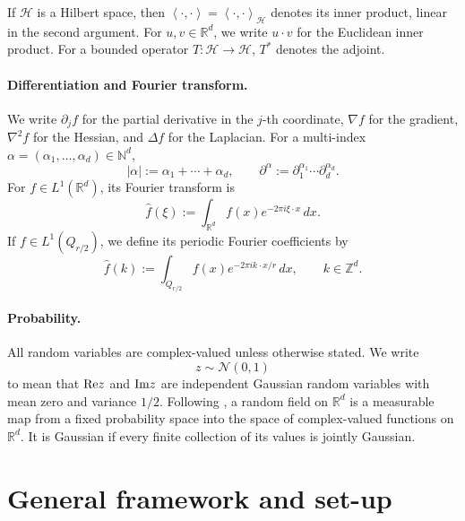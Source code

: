 \documentclass[11pt]{article}
\theoremstyle{definition}
\numberwithin{theorem}{section}
\numberwithin{lemma}{section}
\numberwithin{equation}{section}
\def\N{\mathbb{N}}
\def\R{\mathbb{R}}
\def\Z{\mathbb{Z}}
\renewcommand{\hat}{\widehat}
\renewcommand{\Re}{{\rm Re}}
\renewcommand{\Im}{{\rm Im}}
\newcommand{\inner}[1]{{\left\langle#1\right\rangle}}
\numberwithin{equation}{section}
\begin{document}
If ${\mathcal H}$ is a Hilbert space, then $\inner{\cdot,\cdot}=\inner{\cdot,\cdot}_{\mathcal H}$ denotes its inner product, linear in the second argument. For $u,v\in\R^d$, we write $u\cdot v$ for the Euclidean inner product. For a bounded operator $T\colon {\mathcal H}\to{\mathcal H}$, $T^*$ denotes the adjoint.

\paragraph{Differentiation and Fourier transform.}
We write $\partial_j f$ for the partial derivative in the $j$-th coordinate, $\nabla f$ for the gradient, $\nabla^2 f$ for the Hessian, and $\Delta f$ for the Laplacian. For a multi-index $\alpha=(\alpha_1,\dots,\alpha_d)\in\N^d$,
\[
|\alpha|:=\alpha_1+\cdots+\alpha_d,
\qquad
\partial^\alpha:=\partial_1^{\alpha_1}\cdots \partial_d^{\alpha_d}.
\]
For $f\in L^1(\R^d)$, its Fourier transform is
\[
\hat f(\xi):=\int_{\R^d} f(x)e^{-2\pi i \xi\cdot x}\,dx.
\]
If $f\in L^1(Q_{r/2})$, we define its periodic Fourier coefficients by
\[
\hat f(k):=\int_{Q_{r/2}} f(x)e^{-2\pi i k\cdot x/r}\,dx,
\qquad k\in\Z^d.
\]

\paragraph{Probability.}
All random variables are complex-valued unless otherwise stated. We write
\[
z\sim \mathcal N(0,1)
\]
to mean that $\Re z$ and $\Im z$ are independent Gaussian random variables with mean zero and variance $1/2$. Following \cite{adler2007random}, a random field on $\R^d$ is a measurable map from a fixed probability space into the space of complex-valued functions on $\R^d$. It is Gaussian if every finite collection of its values is jointly Gaussian.



	
	\section{General framework and set-up}
	\label{sec:setup}
	
\end{document}
